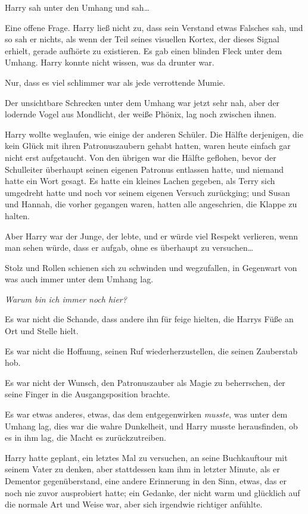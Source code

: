{Harry sah unter den Umhang und sah…

Eine offene Frage. Harry ließ nicht zu, dass sein Verstand etwas Falsches sah, und so sah er nichts, als wenn der Teil seines visuellen Kortex, der dieses Signal erhielt, gerade aufhörte zu existieren. Es gab einen blinden Fleck unter dem Umhang. Harry konnte nicht wissen, was da drunter war.

Nur, dass es viel schlimmer war als jede verrottende Mumie.

Der unsichtbare Schrecken unter dem Umhang war jetzt sehr nah, aber der lodernde Vogel aus Mondlicht, der weiße Phönix, lag noch zwischen ihnen.

Harry wollte weglaufen, wie einige der anderen Schüler. Die Hälfte derjenigen, die kein Glück mit ihren Patronuszaubern gehabt hatten, waren heute einfach gar nicht erst aufgetaucht. Von den übrigen war die Hälfte geflohen, bevor der Schulleiter überhaupt seinen eigenen Patronus entlassen hatte, und niemand hatte ein Wort gesagt. Es hatte ein kleines Lachen gegeben, als Terry sich umgedreht hatte und noch vor seinem eigenen Versuch zurückging; und Susan und Hannah, die vorher gegangen waren, hatten alle angeschrien, die Klappe zu halten.

Aber Harry war der Junge, der lebte, und er würde viel Respekt verlieren, wenn man sehen würde, dass er aufgab, ohne es überhaupt zu versuchen…

Stolz und Rollen schienen sich zu schwinden und wegzufallen, in Gegenwart von was auch immer unter dem Umhang lag.

\emph{Warum bin ich immer noch hier?}

Es war nicht die Schande, dass andere ihn für feige hielten, die Harrys Füße an Ort und Stelle hielt.

Es war nicht die Hoffnung, seinen Ruf wiederherzustellen, die seinen Zauberstab hob.

Es war nicht der Wunsch, den Patronuszauber als Magie zu beherrschen, der seine Finger in die Ausgangsposition brachte.

Es war etwas anderes, etwas, das dem entgegenwirken \emph{musste}, was unter dem Umhang lag, dies war die wahre Dunkelheit, und Harry musste herausfinden, ob es in ihm lag, die Macht es zurückzutreiben.

Harry hatte geplant, ein letztes Mal zu versuchen, an seine Buchkauftour mit seinem Vater zu denken, aber stattdessen kam ihm in letzter Minute, als er Dementor gegenüberstand, eine andere Erinnerung in den Sinn, etwas, das er noch nie zuvor ausprobiert hatte; ein Gedanke, der nicht warm und glücklich auf die normale Art und Weise war, aber sich irgendwie richtiger anfühlte.

}
